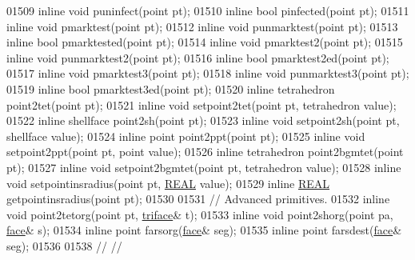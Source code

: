 \begin{DoxyCode}
01509   \textcolor{keyword}{inline} \textcolor{keywordtype}{void} puninfect(point pt);
01510   \textcolor{keyword}{inline} \textcolor{keywordtype}{bool} pinfected(point pt);
01511   \textcolor{keyword}{inline} \textcolor{keywordtype}{void} pmarktest(point pt);
01512   \textcolor{keyword}{inline} \textcolor{keywordtype}{void} punmarktest(point pt);
01513   \textcolor{keyword}{inline} \textcolor{keywordtype}{bool} pmarktested(point pt);
01514   \textcolor{keyword}{inline} \textcolor{keywordtype}{void} pmarktest2(point pt);
01515   \textcolor{keyword}{inline} \textcolor{keywordtype}{void} punmarktest2(point pt);
01516   \textcolor{keyword}{inline} \textcolor{keywordtype}{bool} pmarktest2ed(point pt);
01517   \textcolor{keyword}{inline} \textcolor{keywordtype}{void} pmarktest3(point pt);
01518   \textcolor{keyword}{inline} \textcolor{keywordtype}{void} punmarktest3(point pt);
01519   \textcolor{keyword}{inline} \textcolor{keywordtype}{bool} pmarktest3ed(point pt);
01520   \textcolor{keyword}{inline} tetrahedron point2tet(point pt);
01521   \textcolor{keyword}{inline} \textcolor{keywordtype}{void} setpoint2tet(point pt, tetrahedron value);
01522   \textcolor{keyword}{inline} shellface point2sh(point pt);
01523   \textcolor{keyword}{inline} \textcolor{keywordtype}{void} setpoint2sh(point pt, shellface value);
01524   \textcolor{keyword}{inline} point point2ppt(point pt);
01525   \textcolor{keyword}{inline} \textcolor{keywordtype}{void} setpoint2ppt(point pt, point value);
01526   \textcolor{keyword}{inline} tetrahedron point2bgmtet(point pt);
01527   \textcolor{keyword}{inline} \textcolor{keywordtype}{void} setpoint2bgmtet(point pt, tetrahedron value);
01528   \textcolor{keyword}{inline} \textcolor{keywordtype}{void} setpointinsradius(point pt, \hyperlink{tetgen_8h_a4b654506f18b8bfd61ad2a29a7e38c25}{REAL} value);
01529   \textcolor{keyword}{inline} \hyperlink{tetgen_8h_a4b654506f18b8bfd61ad2a29a7e38c25}{REAL} getpointinsradius(point pt);
01530 
01531   \textcolor{comment}{// Advanced primitives.}
01532   \textcolor{keyword}{inline} \textcolor{keywordtype}{void} point2tetorg(point pt, \hyperlink{classtetgenmesh_1_1triface}{triface}& t);
01533   \textcolor{keyword}{inline} \textcolor{keywordtype}{void} point2shorg(point pa, \hyperlink{classtetgenmesh_1_1face}{face}& s);
01534   \textcolor{keyword}{inline} point farsorg(\hyperlink{classtetgenmesh_1_1face}{face}& seg);
01535   \textcolor{keyword}{inline} point farsdest(\hyperlink{classtetgenmesh_1_1face}{face}& seg);
01536 
01538 \textcolor{comment}{//                                                                           //}

\end{DoxyCode}
